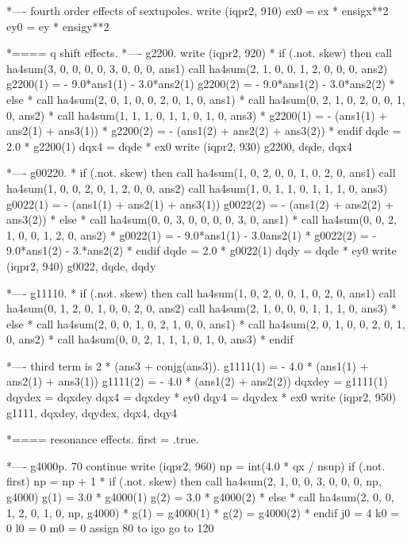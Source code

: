 *---- fourth order effects of sextupoles.
      write (iqpr2, 910)
      ex0 = ex * ensigx**2
      ey0 = ey * ensigy**2
 
*==== q shift effects.
*---- g2200.
      write (iqpr2, 920)
*     if (.not. skew) then
        call ha4sum(3, 0, 0, 0, 0, 3, 0, 0, 0, ans1)
        call ha4sum(2, 1, 0, 0, 1, 2, 0, 0, 0, ans2)
        g2200(1) = - 9.0*ans1(1) - 3.0*ans2(1)
        g2200(2) = - 9.0*ans1(2) - 3.0*ans2(2)
*     else
*       call ha4sum(2, 0, 1, 0, 0, 2, 0, 1, 0, ans1)
*       call ha4sum(0, 2, 1, 0, 2, 0, 0, 1, 0, ans2)
*       call ha4sum(1, 1, 1, 0, 1, 1, 0, 1, 0, ans3)
*       g2200(1) = - (ans1(1) + ans2(1) + ans3(1))
*       g2200(2) = - (ans1(2) + ans2(2) + ans3(2))
*     endif
      dqde = 2.0 * g2200(1)
      dqx4 = dqde * ex0
      write (iqpr2, 930) g2200, dqde, dqx4
 
*---- g00220.
*     if (.not. skew) then
        call ha4sum(1, 0, 2, 0, 0, 1, 0, 2, 0, ans1)
        call ha4sum(1, 0, 0, 2, 0, 1, 2, 0, 0, ans2)
        call ha4sum(1, 0, 1, 1, 0, 1, 1, 1, 0, ans3)
        g0022(1) = - (ans1(1) + ans2(1) + ans3(1))
        g0022(2) = - (ans1(2) + ans2(2) + ans3(2))
*     else
*       call ha4sum(0, 0, 3, 0, 0, 0, 0, 3, 0, ans1)
*       call ha4sum(0, 0, 2, 1, 0, 0, 1, 2, 0, ans2)
*       g0022(1) = - 9.0*ans1(1) - 3.0ans2(1)
*       g0022(2) = - 9.0*ans1(2) - 3.*ans2(2)
*     endif
      dqde = 2.0 * g0022(1)
      dqdy = dqde * ey0
      write (iqpr2, 940) g0022, dqde, dqdy
 
*---- g11110.
*     if (.not. skew) then
        call ha4sum(1, 0, 2, 0, 0, 1, 0, 2, 0, ans1)
        call ha4sum(0, 1, 2, 0, 1, 0, 0, 2, 0, ans2)
        call ha4sum(2, 1, 0, 0, 0, 1, 1, 1, 0, ans3)
*     else
*       call ha4sum(2, 0, 0, 1, 0, 2, 1, 0, 0, ans1)
*       call ha4sum(2, 0, 1, 0, 0, 2, 0, 1, 0, ans2)
*       call ha4sum(0, 0, 2, 1, 1, 1, 0, 1, 0, ans3)
*     endif
 
*---- third term is 2 * (ans3 + conjg(ans3)).
      g1111(1) = - 4.0 * (ans1(1) + ans2(1) + ans3(1))
      g1111(2) = - 4.0 * (ans1(2) + ans2(2))
      dqxdey = g1111(1)
      dqydex = dqxdey
      dqx4 = dqxdey * ey0
      dqy4 = dqydex * ex0
      write (iqpr2, 950) g1111, dqxdey, dqydex, dqx4, dqy4
 
*==== resonance effects.
      first = .true.
 
*---- g4000p.
   70 continue
      write (iqpr2, 960)
      np = int(4.0 * qx / nsup)
      if (.not. first) np = np + 1
*     if (.not. skew) then
        call ha4sum(2, 1, 0, 0, 3, 0, 0, 0, np, g4000)
        g(1) = 3.0 * g4000(1)
        g(2) = 3.0 * g4000(2)
*     else
*       call ha4sum(2, 0, 0, 1, 2, 0, 1, 0, np, g4000)
*       g(1) = g4000(1)
*       g(2) = g4000(2)
*     endif
      j0 = 4
      k0 = 0
      l0 = 0
      m0 = 0
      assign 80 to igo
      go to 120
 
